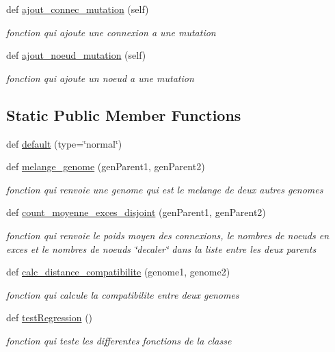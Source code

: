 \begin{DoxyCompactItemize}
def \hyperlink{classsrc_1_1_i_a_1_1genome_1_1_genome_a6f7059702835cf2c68493e9b55216c74}{ajout\+\_\+connec\+\_\+mutation} (self)
\begin{DoxyCompactList}\small\item\em fonction qui ajoute une connexion a une mutation \end{DoxyCompactList}\item 
def \hyperlink{classsrc_1_1_i_a_1_1genome_1_1_genome_a48edc3632415eccdb7116dec4d9ba8c0}{ajout\+\_\+noeud\+\_\+mutation} (self)
\begin{DoxyCompactList}\small\item\em fonction qui ajoute un noeud a une mutation \end{DoxyCompactList}\end{DoxyCompactItemize}
\subsection*{Static Public Member Functions}
\begin{DoxyCompactItemize}
\item 
def \hyperlink{classsrc_1_1_i_a_1_1genome_1_1_genome_abaffc777e83e14be746e97f0b7b30738}{default} (type=\char`\"{}normal\char`\"{})
\item 
def \hyperlink{classsrc_1_1_i_a_1_1genome_1_1_genome_aa0ad761608127d6f8cdb4287149643fd}{melange\+\_\+genome} (gen\+Parent1, gen\+Parent2)
\begin{DoxyCompactList}\small\item\em fonction qui renvoie une genome qui est le melange de deux autres genomes \end{DoxyCompactList}\item 
def \hyperlink{classsrc_1_1_i_a_1_1genome_1_1_genome_ac41d60cc40e0bbc452046d888196ac8d}{count\+\_\+moyenne\+\_\+exces\+\_\+disjoint} (gen\+Parent1, gen\+Parent2)
\begin{DoxyCompactList}\small\item\em fonction qui renvoie le poids moyen des connexions, le nombres de noeuds en exces et le nombres de noeuds \char`\"{}decaler\char`\"{} dans la liste entre les deux parents \end{DoxyCompactList}\item 
def \hyperlink{classsrc_1_1_i_a_1_1genome_1_1_genome_a03d70c35344336c68ea06ebcea2dd941}{calc\+\_\+distance\+\_\+compatibilite} (genome1, genome2)
\begin{DoxyCompactList}\small\item\em fonction qui calcule la compatibilite entre deux genomes \end{DoxyCompactList}\item 
def \hyperlink{classsrc_1_1_i_a_1_1genome_1_1_genome_aba41837f605eb830e5d6afb8b120d1de}{test\+Regression} ()
\begin{DoxyCompactList}\small\item\em fonction qui teste les differentes fonctions de la classe \end{DoxyCompactList}\end{DoxyCompactItemize}


